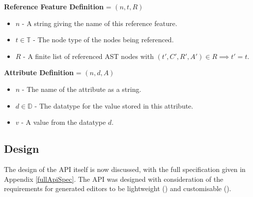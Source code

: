 \documentclass{article}
\begin{document}
%
\textbf{Reference Feature Definition} = $(n,t,R)$ 
\begin{itemize}
\item $n$ - A string giving the name of this reference feature.
\item $t\in \mathbb{T}$ - The node type of the nodes being referenced.
\item $R$ - A finite list of referenced AST nodes with $(t',C',R',A') \in R \implies t'=t$.
\end{itemize}
%
\textbf{Attribute Definition} = $(n,d,A)$ 
\begin{itemize}
\item $n$ - The name of the attribute as a string.
\item $d\in \mathbb{D}$ - The datatype for the value stored in this attribute.
\item $v$ - A value from the datatype $d$.
\end{itemize}
%
\subsection{Design}\label{apiDesign}
The design of the API itself is now discussed, with the full specification given in Appendix \ref{fullApiSpec}. The API was designed with consideration of the requirements for generated editors to be lightweight (\RLightweight) and customisable (\RCustom).
\end{document}
